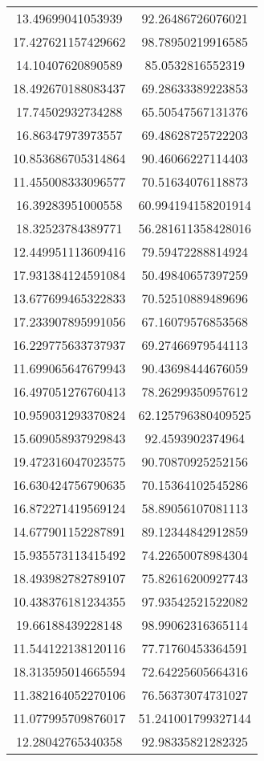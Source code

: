 \begin{table}
\begin{tabular}{cc}
13.49699041053939 & 92.26486726076021 \\
17.427621157429662 & 98.78950219916585 \\
14.10407620890589 & 85.0532816552319 \\
18.492670188083437 & 69.28633389223853 \\
17.74502932734288 & 65.50547567131376 \\
16.86347973973557 & 69.48628725722203 \\
10.853686705314864 & 90.46066227114403 \\
11.455008333096577 & 70.51634076118873 \\
16.39283951000558 & 60.994194158201914 \\
18.32523784389771 & 56.281611358428016 \\
12.449951113609416 & 79.59472288814924 \\
17.931384124591084 & 50.49840657397259 \\
13.677699465322833 & 70.52510889489696 \\
17.233907895991056 & 67.16079576853568 \\
16.229775633737937 & 69.27466979544113 \\
11.699065647679943 & 90.43698444676059 \\
16.497051276760413 & 78.26299350957612 \\
10.959031293370824 & 62.125796380409525 \\
15.609058937929843 & 92.4593902374964 \\
19.472316047023575 & 90.70870925252156 \\
16.630424756790635 & 70.15364102545286 \\
16.872271419569124 & 58.89056107081113 \\
14.677901152287891 & 89.12344842912859 \\
15.935573113415492 & 74.22650078984304 \\
18.493982782789107 & 75.82616200927743 \\
10.438376181234355 & 97.93542521522082 \\
19.66188439228148 & 98.99062316365114 \\
11.544122138120116 & 77.71760453364591 \\
18.313595014665594 & 72.64225605664316 \\
11.382164052270106 & 76.56373074731027 \\
11.077995709876017 & 51.241001799327144 \\
12.28042765340358 & 92.98335821282325 \\

\end{tabular}
\end{table}
